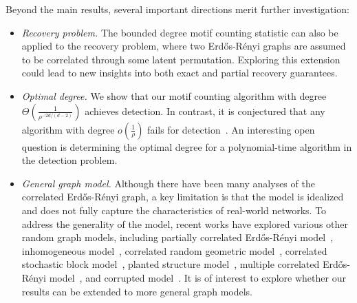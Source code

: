 \documentclass[letterpaper,11pt]{article}
\theoremstyle{definition}
\newcommand{\pth}[1]{\left( #1 \right)}
\newcommand{\ER}{Erd\H{o}s-R\'enyi }
\begin{document}
Beyond the main results, several important directions merit further investigation:
\begin{itemize}
    \item \emph{Recovery problem.} The bounded degree motif counting statistic can also be applied to the recovery problem, where two \ER graphs are assumed to be correlated through some latent permutation. Exploring this extension could lead to new insights into both exact and partial recovery guarantees.
    \item \emph{Optimal degree.} We show that our motif counting algorithm  with degree $\Theta\pth{\frac{1}{\rho^{-2d/(d-2)}}}$ achieves detection. In contrast,  it is conjectured that any algorithm with degree $o\pth{\frac{1}{\rho}}$ fails for detection~\citep{ding2023low,li2025algorithmic}. An interesting open question is determining the optimal degree for a polynomial-time algorithm in the detection problem.
    \item \emph{General graph model.} Although there have been many analyses of the correlated \ER graph, a key limitation is that the model is idealized and does not fully capture the characteristics of real-world networks. To address the generality of the model, recent works have explored various other random graph models, including partially correlated \ER model~\citep{huang2024information}, inhomogeneous model~\citep{ding2023efficiently}, correlated random geometric model~\citep{wang2022random,gong2024umeyama}, correlated stochastic block model~\citep{chen2024computational,chen2025detecting}, planted structure model~\citep{mao2024informationtheoretic}, multiple correlated \ER model~\citep{ameen2024exact}, and corrupted model~\citep{ameen2024robust}. It is of interest to explore whether our results can be extended to more general graph models.
\end{itemize}
\end{document}
